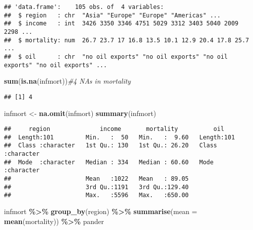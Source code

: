 \documentclass[
]{article}
\newenvironment{Shaded}{\begin{snugshade}}{\end{snugshade}}
\newcommand{\AttributeTok}[1]{\textcolor[rgb]{0.13,0.29,0.53}{#1}}
\newcommand{\CommentTok}[1]{\textcolor[rgb]{0.56,0.35,0.01}{\textit{#1}}}
\newcommand{\FunctionTok}[1]{\textcolor[rgb]{0.13,0.29,0.53}{\textbf{#1}}}
\newcommand{\NormalTok}[1]{#1}
\newcommand{\OtherTok}[1]{\textcolor[rgb]{0.56,0.35,0.01}{#1}}
\newcommand{\SpecialCharTok}[1]{\textcolor[rgb]{0.81,0.36,0.00}{\textbf{#1}}}
\begin{document}
\begin{verbatim}
## 'data.frame':    105 obs. of  4 variables:
##  $ region   : chr  "Asia" "Europe" "Europe" "Americas" ...
##  $ income   : int  3426 3350 3346 4751 5029 3312 3403 5040 2009 2298 ...
##  $ mortality: num  26.7 23.7 17 16.8 13.5 10.1 12.9 20.4 17.8 25.7 ...
##  $ oil      : chr  "no oil exports" "no oil exports" "no oil exports" "no oil exports" ...
\end{verbatim}

\begin{Shaded}
\begin{Highlighting}[]
  \FunctionTok{sum}\NormalTok{(}\FunctionTok{is.na}\NormalTok{(infmort))}\CommentTok{\#4 NAs in mortality}
\end{Highlighting}
\end{Shaded}

\begin{verbatim}
## [1] 4
\end{verbatim}

\begin{Shaded}
\begin{Highlighting}[]
\NormalTok{  infmort }\OtherTok{\textless{}{-}} \FunctionTok{na.omit}\NormalTok{(infmort) }
  \FunctionTok{summary}\NormalTok{(infmort)}
\end{Highlighting}
\end{Shaded}

\begin{verbatim}
##     region              income       mortality          oil           
##  Length:101         Min.   :  50   Min.   :  9.60   Length:101        
##  Class :character   1st Qu.: 130   1st Qu.: 26.20   Class :character  
##  Mode  :character   Median : 334   Median : 60.60   Mode  :character  
##                     Mean   :1022   Mean   : 89.05                     
##                     3rd Qu.:1191   3rd Qu.:129.40                     
##                     Max.   :5596   Max.   :650.00
\end{verbatim}

\begin{Shaded}
\begin{Highlighting}[]
\NormalTok{  infmort }\SpecialCharTok{\%\textgreater{}\%}
\FunctionTok{group\_by}\NormalTok{(region) }\SpecialCharTok{\%\textgreater{}\%}
\FunctionTok{summarise}\NormalTok{(}\AttributeTok{mean =} \FunctionTok{mean}\NormalTok{(mortality)) }\SpecialCharTok{\%\textgreater{}\%}\NormalTok{ pander}
\end{Highlighting}
\end{Shaded}
\end{document}
